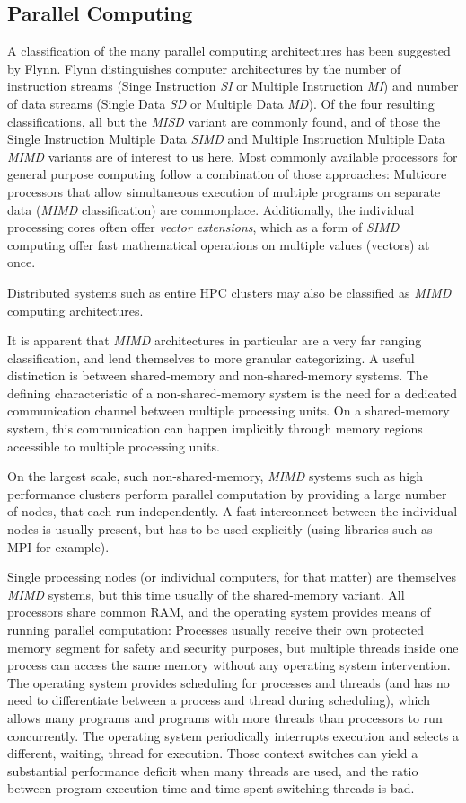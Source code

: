 \documentclass[BCOR20mm,DIV14,10pt,headinclude,footexclude,bibtotoc,liststotoc]{article}
\begin{document}
\subsection{Parallel Computing}
\label{sec:parallel_computing}
A classification of the many parallel computing architectures has been suggested
by Flynn. Flynn distinguishes computer architectures by the number of
instruction streams (Singe Instruction \emph{SI} or Multiple Instruction
\emph{MI}) and number of data streams (Single Data \emph{SD} or Multiple Data
\emph{MD}). Of the four resulting classifications, all but the \emph{MISD}
variant are commonly found, and of those the Single Instruction Multiple Data
\emph{SIMD} and Multiple Instruction Multiple Data \emph{MIMD} variants are of
interest to us here. Most commonly available processors for general purpose
computing follow a combination of those approaches: Multicore processors that
allow simultaneous execution of multiple programs on separate data (\emph{MIMD}
classification) are commonplace. Additionally, the individual processing cores
often offer \emph{vector extensions}, which as a form of \emph{SIMD} computing
offer fast mathematical operations on multiple values (vectors) at once.

Distributed systems such as entire HPC clusters may also be classified as
\emph{MIMD} computing architectures.

It is apparent that \emph{MIMD} architectures in particular are a very far
ranging classification, and lend themselves to more granular categorizing. A
useful distinction is between shared-memory and non-shared-memory systems. The
defining characteristic of a non-shared-memory system is the need for a
dedicated communication channel between multiple processing units. On a
shared-memory system, this communication can happen implicitly through memory
regions accessible to multiple processing units.

On the largest scale, such non-shared-memory, \emph{MIMD} systems such as high
performance clusters perform parallel computation by providing a large number of
nodes, that each run independently. A fast interconnect between the individual
nodes is usually present, but has to be used explicitly (using libraries such as
MPI for example).

Single processing nodes (or individual computers, for that matter) are
themselves \emph{MIMD} systems, but this time usually of the shared-memory
variant. All processors share common RAM, and the operating system provides
means of running parallel computation: Processes usually receive their own
protected memory segment for safety and security purposes, but multiple threads
inside one process can access the same memory without any operating system
intervention. The operating system provides scheduling for processes and threads
(and has no need to differentiate between a process and thread during
scheduling), which allows many programs and programs with more threads than
processors to run concurrently. The operating system periodically interrupts
execution and selects a different, waiting, thread for execution. Those context
switches can yield a substantial performance deficit when many threads are used,
and the ratio between program execution time and time spent switching threads is
bad.
\end{document}
